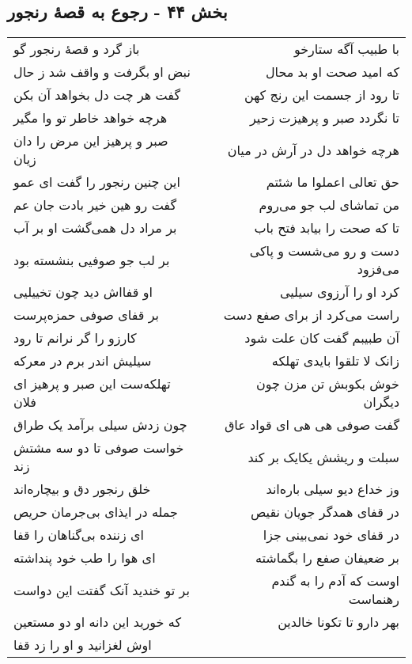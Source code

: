 \begin{center}
\section*{بخش ۴۴ - رجوع به قصهٔ رنجور}
\label{sec:sh044}
\begin{longtable}{l p{0.5cm} r}
باز گرد و قصهٔ رنجور گو
&&
با طبیب آگه ستارخو
\\
نبض او بگرفت و واقف شد ز حال
&&
که امید صحت او بد محال
\\
گفت هر چت دل بخواهد آن بکن
&&
تا رود از جسمت این رنج کهن
\\
هرچه خواهد خاطر تو وا مگیر
&&
تا نگردد صبر و پرهیزت زحیر
\\
صبر و پرهیز این مرض را دان زیان
&&
هرچه خواهد دل در آرش در میان
\\
این چنین رنجور را گفت ای عمو
&&
حق تعالی اعملوا ما شئتم
\\
گفت رو هین خیر بادت جان عم
&&
من تماشای لب جو می‌روم
\\
بر مراد دل همی‌گشت او بر آب
&&
تا که صحت را بیابد فتح باب
\\
بر لب جو صوفیی بنشسته بود
&&
دست و رو می‌شست و پاکی می‌فزود
\\
او قفااش دید چون تخییلیی
&&
کرد او را آرزوی سیلیی
\\
بر قفای صوفی حمزه‌پرست
&&
راست می‌کرد از برای صفع دست
\\
کارزو را گر نرانم تا رود
&&
آن طبیبم گفت کان علت شود
\\
سیلیش اندر برم در معرکه
&&
زانک لا تلقوا بایدی تهلکه
\\
تهلکه‌ست این صبر و پرهیز ای فلان
&&
خوش بکوبش تن مزن چون دیگران
\\
چون زدش سیلی برآمد یک طراق
&&
گفت صوفی هی هی ای قواد عاق
\\
خواست صوفی تا دو سه مشتش زند
&&
سبلت و ریشش یکایک بر کند
\\
خلق رنجور دق و بیچاره‌اند
&&
وز خداع دیو سیلی باره‌اند
\\
جمله در ایذای بی‌جرمان حریص
&&
در قفای همدگر جویان نقیص
\\
ای زننده بی‌گناهان را قفا
&&
در قفای خود نمی‌بینی جزا
\\
ای هوا را طب خود پنداشته
&&
بر ضعیفان صفع را بگماشته
\\
بر تو خندید آنک گفتت این دواست
&&
اوست که آدم را به گندم رهنماست
\\
که خورید این دانه او دو مستعین
&&
بهر دارو تا تکونا خالدین
\\
اوش لغزانید و او را زد قفا

\end{longtable}
\end{center}
